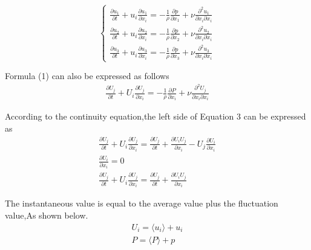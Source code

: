 \begin{equation}
\left\{
\begin{aligned}
\frac{\partial u_{1}}{\partial t}+u_{i}\frac{\partial u_{1}}{\partial x_{i}}=-\frac{1}{\rho}\frac{\partial p}{\partial x_{1}}+\nu\frac{\partial^2 u_{1}}{\partial x_{i} \partial x_{i}}\\
\frac{\partial u_{2}}{\partial t}+u_{i}\frac{\partial u_{2}}{\partial x_{i}}=-\frac{1}{\rho}\frac{\partial p}{\partial x_{2}}+\nu\frac{\partial^2 u_{2}}{\partial x_{i} \partial x_{i}}\\
\frac{\partial u_{3}}{\partial t}+u_{i}\frac{\partial u_{3}}{\partial x_{i}}=-\frac{1}{\rho}\frac{\partial p}{\partial x_{3}}+\nu\frac{\partial^2 u_{3}}{\partial x_{i} \partial x_{i}} 
\end{aligned}
\right.
\end{equation}

Formula (1) can also be expressed as follows
\begin{equation}
\begin{aligned}
\frac{\partial U_{j}}{\partial t}+U_{i}\frac{\partial U_{j}}{\partial x_{i}}=-\frac{1}{\rho}\frac{\partial P}{\partial x_{i}}+\nu\frac{\partial^2 U_{j}}{\partial x_{i}\partial x_{i}}
\end{aligned}
\end{equation}

According to the continuity equation,the left side of Equation 3 can be expressed as
\begin{equation}
\begin{aligned}
\frac{\partial U_{j}}{\partial t}+U_{i}\frac{\partial U_{j}}{\partial x_{i}}=\frac{\partial U_{j}}{\partial t}+\frac{\partial U_{i}U_{j}}{\partial x_{i}}-U_{j}\frac{\partial U_{i}}{\partial x_{i}}\\
\frac{\partial U_{i}}{\partial x_{i}}=0\\
\frac{\partial U_{j}}{\partial t}+U_{i}\frac{\partial U_{j}}{\partial x_{i}}=\frac{\partial U_{j}}{\partial t}+\frac{\partial U_{i}U_{j}}{\partial x_{i}}
\end{aligned}
\end{equation}

The instantaneous value is equal to the average value plus the fluctuation value,As shown below.
\begin{equation}
\begin{aligned}
U_{i}=\langle u_{i}\rangle +u_{i}\\
P=\langle P \rangle+p
\end{aligned}
\end{equation}


